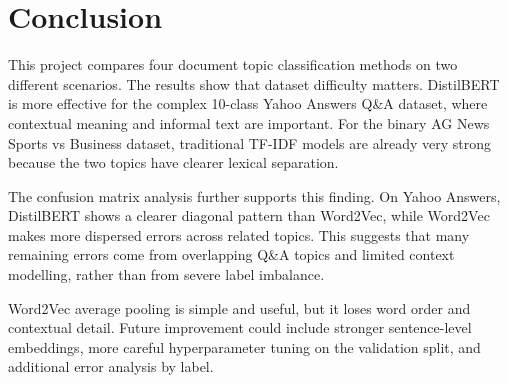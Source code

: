 \section{Conclusion}

This project compares four document topic classification methods on two different scenarios. The results show that dataset difficulty matters. DistilBERT is more effective for the complex 10-class Yahoo Answers Q\&A dataset, where contextual meaning and informal text are important. For the binary AG News Sports vs Business dataset, traditional TF-IDF models are already very strong because the two topics have clearer lexical separation.

The confusion matrix analysis further supports this finding. On Yahoo Answers, DistilBERT shows a clearer diagonal pattern than Word2Vec, while Word2Vec makes more dispersed errors across related topics. This suggests that many remaining errors come from overlapping Q\&A topics and limited context modelling, rather than from severe label imbalance.

Word2Vec average pooling is simple and useful, but it loses word order and contextual detail. Future improvement could include stronger sentence-level embeddings, more careful hyperparameter tuning on the validation split, and additional error analysis by label.